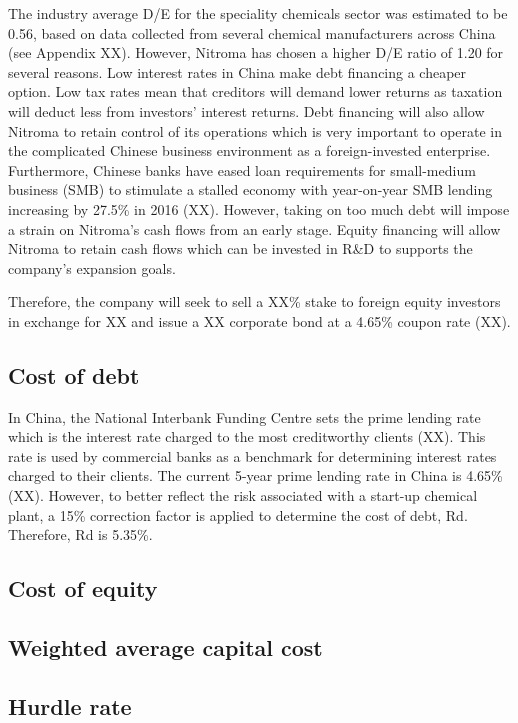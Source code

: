 The industry average D/E for the speciality chemicals sector was estimated to be 0.56, based on data collected from several chemical manufacturers across China (see Appendix XX). However, Nitroma has chosen a higher D/E ratio of 1.20 for several reasons. Low interest rates in China make debt financing a cheaper option. Low tax rates mean that creditors will demand lower returns as taxation will deduct less from investors’ interest returns. Debt financing will also allow Nitroma to retain control of its operations which is very important to operate in the complicated Chinese business environment as a foreign-invested enterprise. Furthermore, Chinese banks have eased loan requirements for small-medium business (SMB) to stimulate a stalled economy with year-on-year SMB lending increasing by 27.5\% in 2016 (XX). However, taking on too much debt will impose a strain on Nitroma’s cash flows from an early stage. Equity financing will allow Nitroma to retain cash flows which can be invested in R&D to supports the company’s expansion goals.

Therefore, the company will seek to sell a XX\% stake to foreign equity investors in exchange for XX and issue a XX corporate bond at a 4.65\% coupon rate (XX).

\subsection{Cost of debt}
In China, the National Interbank Funding Centre sets the prime lending rate which is the interest rate charged to the most creditworthy clients (XX). This rate is used by commercial banks as a benchmark for determining interest rates charged to their clients. The current 5-year prime lending rate in China is 4.65\% (XX). However, to better reflect the risk associated with a start-up chemical plant, a 15\% correction factor is applied to determine the cost of debt, Rd. Therefore, Rd is 5.35\%.

\subsection{Cost of equity}


\subsection{Weighted average capital cost}
\subsection{Hurdle rate}